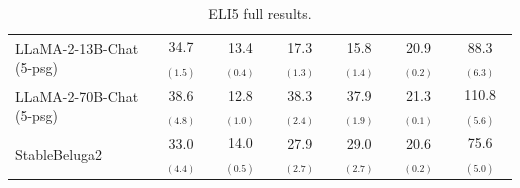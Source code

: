 \documentclass[11pt]{article}
\newcommand{\vani}{{\sc{Vanilla}}}
\begin{document}
\begin{table}[h]
\begin{tabular}{lcccccc}
            LLaMA-2-13B-Chat \vani{} (5-psg) & 34.7 $_{(1.5)}$&13.4 $_{(0.4)}$&17.3 $_{(1.3)}$&15.8 $_{(1.4)}$&20.9 $_{(0.2)}$&88.3 $_{(6.3)}$\\
            LLaMA-2-70B-Chat \vani{} (5-psg)  & 38.6 $_{(4.8)}$&12.8 $_{(1.0)}$&38.3 $_{(2.4)}$&37.9 $_{(1.9)}$&21.3 $_{(0.1)}$&110.8 $_{(5.6)}$\\
            \midrule
            StableBeluga2 & 33.0 $_{(4.4)}$&14.0 $_{(0.5)}$&27.9 $_{(2.7)}$&29.0 $_{(2.7)}$&20.6 $_{(0.2)}$&75.6 $_{(5.0)}$\\
            \bottomrule
        \end{tabular}
    \caption{
        ELI5 full results.
    }
    \label{tab:eli5_full}
\end{table}

\end{document}
